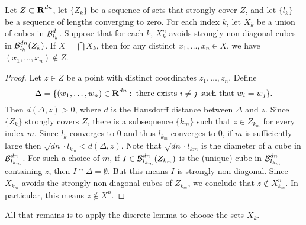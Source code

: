 \begin{lemma} \label{stronglydiagonal}
	Let $Z \subset \operatorname{\mathbf{R}}^{dn}$, let $\{Z_k\}$ be a sequence of sets that strongly cover $Z$, and let $\{ l_k \}$ be a sequence of lengths converging to zero. For each index $k$, let $X_k$ be a union of cubes in $\operatorname{\mathcal{B}}^d_{l_k}$. Suppose that for each $k$, $X_k^n$ avoids strongly non-diagonal cubes in $\operatorname{\mathcal{B}}^{dn}_{l_k}(Z_k)$. If $X = \bigcap X_k$, then for any distinct $x_1, \dots, x_n \in X$, we have $(x_1, \dots, x_n) \not \in Z$.
\end{lemma}
\begin{proof}
	Let $z \in Z$ be a point with distinct coordinates $z_1, \dots, z_n$. Define
	\[ \Delta = \{ (w_1, \dots, w_n) \in \operatorname{\mathbf{R}}^{dn} \operatorname{\colon} \text{there exists $i \neq j$ such that $w_i = w_j$} \}. \]
	Then $d(\Delta,z) > 0$, where $d$ is the Hausdorff distance between $\Delta$ and $z$. Since $\{ Z_k \}$ strongly covers $Z$, there is a subsequence $\{ k_m \}$ such that $z \in Z_{k_m}$ for every index $m$. Since $l_k$ converges to 0 and thus $l_{k_m}$ converges to $0$, if $m$ is sufficiently large then $\sqrt{dn} \cdot l_{k_m} < d(\Delta,z)$. Note that $\sqrt{dn} \cdot l_{km}$ is the diameter of a cube in $\operatorname{\mathcal{B}}_{l_{k_m}}^{dn}$. For such a choice of $m$, if $I\in \operatorname{\mathcal{B}}_{l_{k_m}}^{dn}(Z_{k_m})$ is the (unique) cube in $\operatorname{\mathcal{B}}_{l_{k_m}}^{dn}$ containing $z$, then $I \cap \Delta = \emptyset$. But this means $I$ is strongly non-diagonal. Since $X_{k_m}$ avoids the strongly non-diagonal cubes of $Z_{k_m}$, we conclude that $z \not \in X_{k_m}^n$. In particular, this means $z \not\in X^n$.
\end{proof}

All that remains is to apply the discrete lemma to choose the sets $X_k$.

